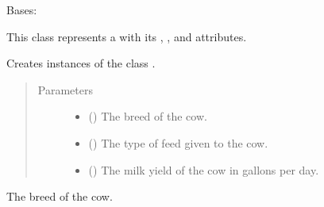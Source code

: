 \documentclass[letterpaper,10pt,english]{sphinxmanual}
\begin{document}
\begin{fulllineitems}
\label{\detokenize{farming:farming.part2.Cow}}
\sphinxAtStartPar
Bases: 

\sphinxAtStartPar
This class represents 
a  with its {\hyperref[\detokenize{farming:farming.part2.Cow.breed}]{}}, {\hyperref[\detokenize{farming:farming.part2.Cow.feed_type}]{}}, and {\hyperref[\detokenize{farming:farming.part2.Cow.milk_yield}]{}} attributes.

\sphinxAtStartPar
Creates instances of the class {\hyperref[\detokenize{farming:farming.part2.Cow}]{}}.
\begin{quote}\begin{description}
\item[{Parameters}] \leavevmode\begin{itemize}
\item {} 
\sphinxAtStartPar
{} () \textendash{} The breed of the cow.

\item {} 
\sphinxAtStartPar
{} () \textendash{} The type of feed given to the cow.

\item {} 
\sphinxAtStartPar
{} () \textendash{} The milk yield of the cow in gallons per day.

\end{itemize}

\end{description}\end{quote}

\begin{fulllineitems}
\label{\detokenize{farming:farming.part2.Cow.breed}}
\sphinxAtStartPar
The breed of the cow.


\end{fulllineitems}
\end{fulllineitems}
\end{document}
